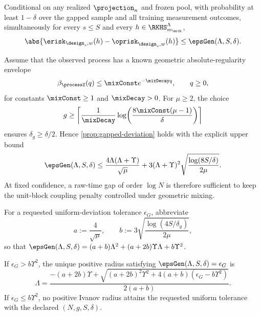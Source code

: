 \begin{proposition}
\label{prop:gapped-deviation}
Conditional on any realized $\projection_n$ and frozen pool, with probability
at least $1-\delta$ over the gapped sample and all training measurement
outcomes, simultaneously for every $s\leq S$ and every
$h\in\RKHS_{m_{\arch}}^\Lambda$,
\begin{equation}
    \abs{\erisk_{\design_s,w}(h)-\oprisk_{\design_s,w}(h)}
    \leq\epsGen(\Lambda,S,\delta).
    \label{eq:gapped-uniform-deviation}
\end{equation}
\end{proposition}

\begin{corollary}
\label{cor:geometric-mixing-gap}
Assume that the observed process has a known geometric absolute-regularity
envelope
\begin{equation}
    \beta_{\processZ}(q)\leq \mixConst e^{-\mixDecay q},
    \qquad q\geq0,
    \label{eq:geometric-mixing-envelope}
\end{equation}
for constants $\mixConst\geq1$ and $\mixDecay>0$.  For $\mu\geq2$, the choice
\begin{equation}
    g\geq
    \left\lceil
      \frac1{\mixDecay}
      \log\!\left(\frac{8\mixConst(\mu-1)}{\delta}\right)
    \right\rceil
    \label{eq:geometric-gap-rule}
\end{equation}
ensures $\delta_g\geq\delta/2$.  Hence
\cref{prop:gapped-deviation} holds with the explicit upper bound
\begin{equation}
    \epsGen(\Lambda,S,\delta)
    \leq
    \frac{4\Lambda(\Lambda+\Upsilon)}{\sqrt\mu}
    +3(\Lambda+\Upsilon)^2
      \sqrt{\frac{\log(8S/\delta)}{2\mu}}.
    \label{eq:geometric-generalization-bound}
\end{equation}
At fixed confidence, a raw-time gap of order $\log N$ is therefore sufficient
to keep the unit-block coupling penalty controlled under geometric mixing.
\end{corollary}

For a requested uniform-deviation tolerance $\epsilon_G$, abbreviate
\[
    a:=\frac4{\sqrt\mu},
    \qquad
    b:=3\sqrt{\frac{\log(4S/\delta_g)}{2\mu}},
\]
so that
$\epsGen(\Lambda,S,\delta)=(a+b)\Lambda^2+(a+2b)\Upsilon\Lambda+b\Upsilon^2$.

\begin{corollary}
\label{cor:ivanov-capacity-calibration}
If $\epsilon_G>b\Upsilon^2$, the unique positive radius satisfying
$\epsGen(\Lambda,S,\delta)=\epsilon_G$ is
\begin{equation}
    \Lambda
    =\frac{-(a+2b)\Upsilon
      +\sqrt{(a+2b)^2\Upsilon^2
        +4(a+b)(\epsilon_G-b\Upsilon^2)}}{2(a+b)}.
    \label{eq:ivanov-radius}
\end{equation}
If $\epsilon_G\leq b\Upsilon^2$, no positive Ivanov radius attains the
requested uniform tolerance with the declared $(N,g,S,\delta)$.
\end{corollary}

